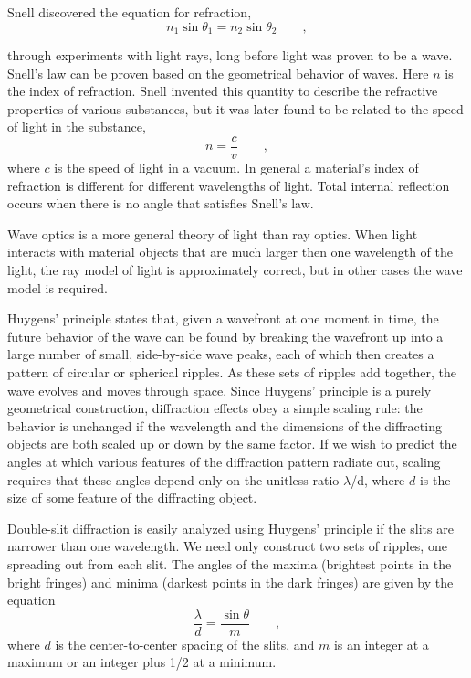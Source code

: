 Snell discovered the equation for refraction,
\begin{equation*}
n_1 \sin \theta_1=n_2 \sin \theta_2 \qquad ,
\end{equation*}
\begin{longnoteafterequation}
\end{longnoteafterequation}
\noindent through experiments with light rays, long before light was
proven to be a wave. Snell's law can be proven based on the
geometrical behavior of waves. Here $n$ is the index of
refraction. Snell invented this quantity to describe the
refractive properties of various substances, but it was
later found to be related to the speed of light in the substance,
\begin{equation*}
                n  =  \frac{c}{v}   \qquad   ,
\end{equation*}
where $c$ is the speed of light in a vacuum. In general a
material's index of refraction is different for different
wavelengths of light.
Total internal reflection occurs when there is no
angle that satisfies Snell's law.

Wave optics is a more general theory of light than ray
optics. When light interacts with material objects that are
much larger then one wavelength of the light, the ray model
of light is approximately correct, but in other cases the
wave model is required.

Huygens' principle states that, given a wavefront at one
moment in time, the future behavior of the wave can be found
by breaking the wavefront up into a large number of small,
side-by-side wave peaks, each of which then creates a
pattern of circular or spherical ripples. As these sets of
ripples add together, the wave evolves and moves through
space. Since Huygens' principle is a purely geometrical
construction, diffraction effects obey a simple scaling
rule: the behavior is unchanged if the wavelength and the
dimensions of the diffracting objects are both scaled up or
down by the same factor. If we wish to predict the angles at
which various features of the diffraction pattern radiate
out, scaling requires that these angles depend only on the
unitless ratio $\lambda $/d, where $d$ is the size of some
feature of the diffracting object.

Double-slit diffraction is easily analyzed using Huygens'
principle if the slits are narrower than one wavelength. We
need only construct two sets of ripples, one spreading out
from each slit. The angles of the maxima (brightest points
in the bright fringes) and minima (darkest points in the
dark fringes) are given by the equation
\begin{equation*}
        \frac{\lambda}{d} = \frac{\sin\theta}{m} \qquad ,
\end{equation*}
where $d$ is the center-to-center spacing of the slits, and
$m$ is an integer at a maximum or an integer plus 1/2 at a minimum.

